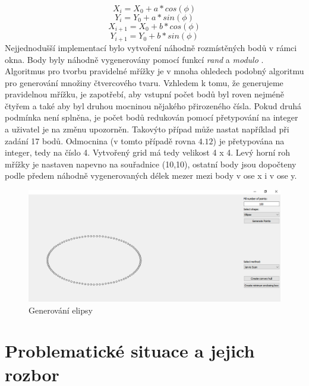 \documentclass[a4paper,11pt,twoside]{article}
\begin{document}
$$ X_i = X_0 + a * cos(\phi)$$
$$ Y_i = Y_0 + a * sin(\phi) $$
$$ X_{i+1} = X_0 + b * cos(\phi)$$
$$ Y_{i+1} = Y_0 + b * sin(\phi) $$
\noindent Nejjednodušší implementací bylo vytvoření náhodně rozmístěných bodů v rámci okna. Body byly náhodně vygenerovány pomocí funkcí \textit{rand} a \textit{modulo} .
\indent Algoritmus pro tvorbu pravidelné mřížky je v mnoha ohledech podobný algoritmu pro generování množiny čtvercového tvaru. Vzhledem k tomu, že generujeme pravidelnou mřížku, je zapotřebí, aby vstupní počet bodů byl roven nejméně čtyřem a také aby byl druhou mocninou nějakého přirozeného čísla. Pokud druhá podmínka není splněna, je počet bodů redukován pomocí přetypování na integer a uživatel je na změnu upozorněn. Takovýto případ může nastat například při zadání 17 bodů. Odmocnina (v tomto případě rovna $4.12$) je přetypována na integer, tedy na číslo 4. Vytvořený grid má tedy velikost 4 x 4. Levý horní roh mřížky je nastaven napevno na souřadnice (10,10), ostatní body jsou dopočteny podle předem náhodně vygenerovaných délek mezer mezi body v ose x i v ose y.

\begin{figure}[hbt!] 
\begin{center}
\includegraphics[width=14cm]{pictures/ellipse.png} 
\caption[Generování elipsy]{Generování elipsy}
\label{fig:ellipse}
\end{center}
\end{figure}
\vspace{-0.4cm}

\newpage
\vspace*{-1cm}
\section{Problematické situace a jejich rozbor}
\end{document}
